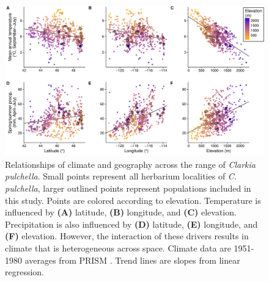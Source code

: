 \documentclass{article}
\begin{document}
\begin{landscape}
\begin{figure}[ht]
\centering
\includegraphics[width=21cm]{figs/climate_geo.pdf}
\caption[Relationships of climate and geography across the range of \textit{Clarkia pulchella}]{Relationships of climate and geography across the range of \textit{Clarkia pulchella}. Small points represent all herbarium localities of \textit{C. pulchella}, larger outlined points represent populations included in this study. Points are colored according to elevation. Temperature is influenced by \textbf{(A)} latitude, \textbf{(B)} longitude, and \textbf{(C)} elevation. Precipitation is also influenced by \textbf{(D)} latitude, \textbf{(E)} longitude, and \textbf{(F)} elevation. However, the interaction of these drivers results in climate that is heterogeneous across space.  Climate data are 1951-1980 averages from PRISM \citep{PRISM}. Trend  lines are slopes from linear regression.}
\label{clim_geo}
\end{figure}
\end{landscape}
\end{document}
